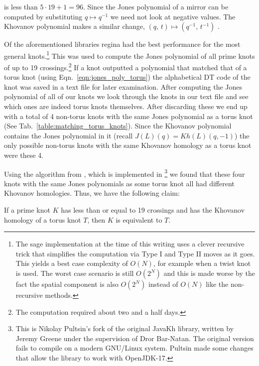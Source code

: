 is less than $5\cdot{19}+1=96$. Since the Jones polynomial of a mirror
can be computed by substituting $q\mapsto{q}^{-1}$ we need not look at
negative values. The Khovanov polynomial makes a similar change,
$(q,\,t)\mapsto(q^{-1},\,t^{-1})$ \cite{WATSON2017915}.
\par\hfill\par
Of the aforementioned libraries regina had the best performance for the most
general knots.\footnote{%
    The sage implementation at the time of this writing uses a clever recursive
    trick that simplifies the computation via Type I and Type II moves as it
    goes. This yields a best case complexity of $O(N)$, for example when a
    twist knot is used. The worst case scenario is still $O(2^{N})$ and this
    is made worse by the fact the spatial component is also $O(2^{N})$ instead
    of $O(N)$ like the non-recursive methods.
}
This was used to compute the Jones polynomial of all prime knots of up to
19 crossings.\footnote{%
    The computation required about two and a half days.
}
If a knot outputted a polynomial that matched that of a torus
knot (using Eqn.~\ref{eqn:jones_poly_torus}) the alphabetical DT code of the
knot was saved in a text file for later examination. After computing the Jones
polynomial of all of our knots we look through the knots in our text file and
see which ones are indeed torus knots themselves. After discarding these
we end up with a total of 4 non-torus knots with the same Jones polynomial as a
torus knot (See Tab.~\ref{table:matching_torus_knots}).
Since the Khovanov polynomial contains the Jones polynomial in it
(recall $J(L)(q)=Kh(L)(q,-1)$) the only possible non-torus knots with
the same Khovanov homology as a torus knot were these 4.
\par\hfill\par
Using the algorithm from \cite{BarNatan2006FASTKH}, which is implemented in
\cite{JavaKhv2}\footnote{
    This is Nikolay Pultsin's fork of the original JavaKh library, written by
    Jeremy Greene under the supervision of Dror Bar-Natan. The original version
    fails to compile on a modern GNU/Linux system. Pultsin made some changes
    that allow the library to work with OpenJDK-17.
}
we found that these four knots with the same Jones polynomials as some
torus knot all had different Khovanov homologies. Thus, we have the
following claim:
\begin{theorem}
    If a prime knot $K$ has less than or equal to 19 crossings and has
    the Khovanov homology of a torus knot $T$,
    then $K$ is equivalent to $T$.
\end{theorem}
